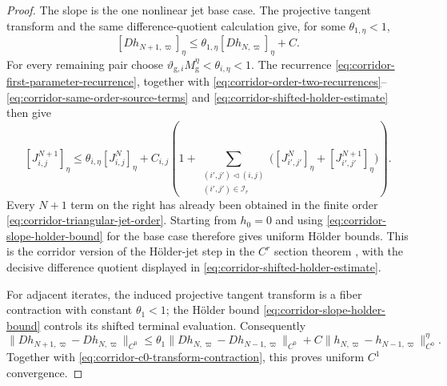 \documentclass[11pt]{amsart}
\numberwithin{equation}{section}
\theoremstyle{definition}
\theoremstyle{remark}
\begin{document}
\begin{proof}
The slope is the one nonlinear jet base case.  The projective tangent
transform and the same difference-quotient calculation give, for some
$\theta_{1,\eta}<1$,
\begin{equation}\label{eq:corridor-slope-holder-bound}
 [Dh_{N+1,\varpi}]_\eta
 \le\theta_{1,\eta}[Dh_{N,\varpi}]_\eta+C.
\end{equation}
For every remaining pair choose
$\vartheta_{\mathrm g,i}M_{\mathrm g}^\eta
 <\theta_{i,\eta}<1$.  The recurrence
\eqref{eq:corridor-first-parameter-recurrence}, together with
\eqref{eq:corridor-order-two-recurrences}--
\eqref{eq:corridor-same-order-source-terms} and
\eqref{eq:corridor-shifted-holder-estimate} then give
\begin{equation}\label{eq:corridor-holder-jet-bound}
 [J_{i,j}^{N+1}]_\eta
 \le\theta_{i,\eta}[J_{i,j}^{N}]_\eta
  +C_{i,j}\!\left(1+
       \sum_{\substack{(i',j')\triangleleft(i,j)\\
                       (i',j')\in\mathcal I_r}}
       \bigl([J_{i',j'}^N]_\eta+[J_{i',j'}^{N+1}]_\eta\bigr)\right).
\end{equation}
Every $N+1$ term on the right has already been obtained in the finite
order \eqref{eq:corridor-triangular-jet-order}.  Starting from $h_0=0$
and using \eqref{eq:corridor-slope-holder-bound} for the base case
therefore gives uniform H\"older bounds.  This is the corridor version of
the H\"older-jet step in the $C^r$ section theorem
\cite[Chapter~3]{HirschPughShub1977InvariantManifolds}, with the decisive
difference quotient displayed in
\eqref{eq:corridor-shifted-holder-estimate}.

For adjacent iterates, the induced projective tangent transform is a fiber
contraction with constant $\theta_1<1$; the H\"older bound
\eqref{eq:corridor-slope-holder-bound} controls its shifted terminal
evaluation.  Consequently
\begin{equation}\label{eq:corridor-slope-cauchy}
 \|Dh_{N+1,\varpi}-Dh_{N,\varpi}\|_{C^0}
 \le\theta_1\|Dh_{N,\varpi}-Dh_{N-1,\varpi}\|_{C^0}
   +C\|h_{N,\varpi}-h_{N-1,\varpi}\|_{C^0}^{\eta}.
\end{equation}
Together with \eqref{eq:corridor-c0-transform-contraction}, this proves
uniform $C^1$ convergence.


\end{proof}
\end{document}
